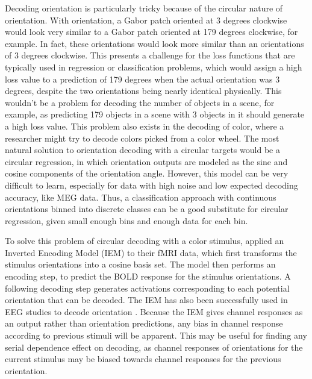 \documentclass[../main.tex]{subfiles}
\begin{document}
Decoding orientation is particularly tricky because of the circular nature of orientation. With orientation, a Gabor patch oriented at 3 degrees clockwise would look very similar to a Gabor patch oriented at 179 degrees clockwise, for example. In fact, these orientations would look more similar than an orientations of 3 degrees clockwise. This presents a challenge for the loss functions that are typically used in regression or classification problems, which would assign a high loss value to a prediction of 179 degrees when the actual orientation was 3 degrees, despite the two orientations being nearly identical physically. This wouldn't be a problem for decoding the number of objects in a scene, for example, as predicting 179 objects in a scene with 3 objects in it should generate a high loss value. This problem also exists in the decoding of color, where a researcher might try to decode colors picked from a color wheel. The most natural solution to orientation decoding with a circular targets would be a circular regression, in which orientation outputs are modeled as the sine and cosine components of the orientation angle. However, this model can be very difficult to learn, especially for data with high noise and low expected decoding accuracy, like MEG data. Thus, a classification approach with continuous orientations binned into discrete classes can be a good substitute for circular regression, given small enough bins and enough data for each bin.

To solve this problem of circular decoding with a color stimulus, \cite{Brouwer09} applied an Inverted Encoding Model (IEM) to their fMRI data, which first transforms the stimulus orientations into a cosine basis set. The model then performs an encoding step, to predict the BOLD response for the stimulus orientations. A following decoding step generates activations corresponding to each potential orientation that can be decoded. The IEM has also been successfully used in EEG studies to decode orientation \cite{GARCIA2013515, sprague_serences_2013, sprague_saproo_serences_2015}. Because the IEM gives channel responses as an output rather than orientation predictions, any bias in channel response according to previous stimuli will be apparent. This may be useful for finding any serial dependence effect on decoding, as channel responses of orientations for the current stimulus may be biased towards channel responses for the previous orientation.
\end{document}
